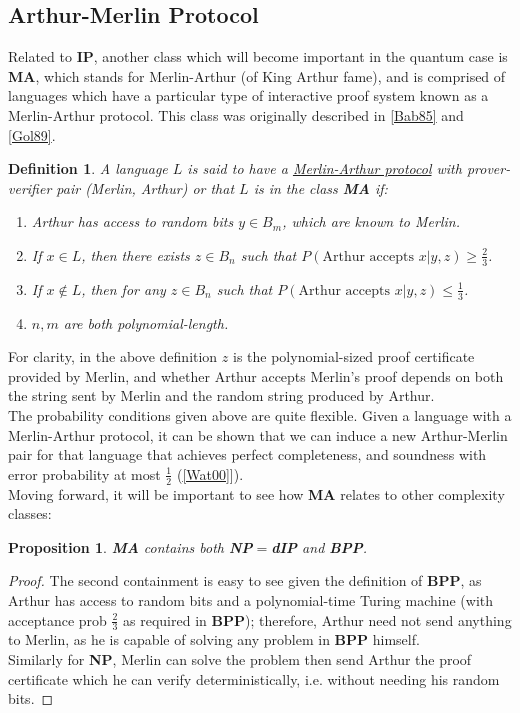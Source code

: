 \documentclass[12pt]{article}
\newtheorem{defn}{Definition}
\newtheorem{prop}{Proposition}
\numberwithin{thm}{section}
\numberwithin{defn}{section}
\numberwithin{prop}{section}
\numberwithin{rmk}{section}
\begin{document}
	\subsection{Arthur-Merlin Protocol}
	Related to \textbf{IP}, another class which will become important in the quantum case is \textbf{MA}, which stands for Merlin-Arthur (of King Arthur fame), and is comprised of languages which have a particular type of interactive proof system known as a Merlin-Arthur protocol. This class was originally described in \hyperref[bab]{[Bab85]} and \hyperref[gol89]{[Gol89]}.
	
	\begin{defn}
		A language $L$ is said to have a \underline{Merlin-Arthur protocol} with prover-verifier pair (Merlin, Arthur) or that $L$ is in the class \textbf{MA} if:
		\begin{enumerate}[label=(\roman*)]
			\item Arthur has access to random bits $y\in B_m$, which are known to Merlin.
			\item If $x\in L$, then there exists $z\in B_n$ such that $P(\text{Arthur accepts }x|y,z)\geq \frac{2}{3}$.
			\item If $x\notin L$, then for any $z\in B_n$ such that $P(\text{Arthur accepts }x|y,z)\leq\frac{1}{3}$. 
			\item $n,m$ are both polynomial-length.
		\end{enumerate}
	
	
	\end{defn}
	 For clarity, in the above definition $z$ is the polynomial-sized proof certificate provided by Merlin, and whether Arthur accepts Merlin's proof depends on both the string sent by Merlin and the random string produced by Arthur.\\
	
	The probability conditions given above are quite flexible. Given a language with a Merlin-Arthur protocol, it can be shown that we can induce a new Arthur-Merlin pair for that language that achieves perfect completeness, and soundness with error probability at most $\frac{1}{2}$ (\hyperref[wat00]{[Wat00]}]).\\
	
	Moving forward, it will be important to see how \textbf{MA} relates to other complexity classes:
	\begin{prop}\textbf{MA} contains both \textbf{NP}$=$\textbf{dIP} and \textbf{BPP}. \end{prop}
	\begin{proof}The second containment is easy to see given the definition of \textbf{BPP}, as Arthur has access to random bits and a polynomial-time Turing machine (with acceptance prob $\frac{2}{3}$ as required in \textbf{BPP}); therefore, Arthur need not send anything to Merlin, as he is capable of solving any problem in \textbf{BPP} himself.\\Similarly for \textbf{NP}, Merlin can solve the problem then send Arthur the proof certificate which he can verify deterministically, i.e. without needing his random bits. \end{proof}
	
\end{document}
